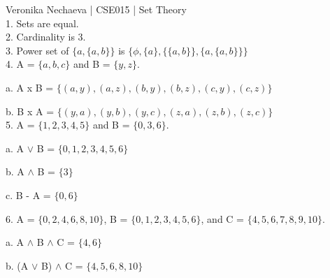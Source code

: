 \documentclass[10pt]{article}
\begin{document}
Veronika Nechaeva | CSE015 | Set Theory \\[\baselineskip]

1. Sets are equal. \\[\baselineskip]

2. Cardinality is 3. \\[\baselineskip]

3. Power set of $\{a,\{a,b\}\}$ is $\{\phi,\{a\},\{\{a,b\}\},\{a,\{a,b\}\}\}$ \\[\baselineskip]

4. A = $\{a,b,c\}$ and B = $\{y,z\}$.

a. A x B = $\{(a,y),(a,z),(b,y),(b,z),(c,y),(c,z)\}$

b. B x A = $\{(y,a),(y,b),(y,c),(z,a),(z,b),(z,c)\}$ \\[\baselineskip]

5. A = $\{1,2,3,4,5\}$ and B = $\{0,3,6\}$.

a. A $\lor$ B = $\{0,1,2,3,4,5,6\}$

b. A $\land$ B = $\{3\}$

c. B - A = $\{0,6\}$

6. A = $\{0,2,4,6,8,10\}$, B = $\{0,1,2,3,4,5,6\}$, and C = $\{4,5,6,7,8,9,10\}$.

a. A $\land$ B $\land$ C = $\{4,6\}$

b. (A $\lor$ B) $\land$ C = $\{4,5,6,8,10\}$
\end{document}

